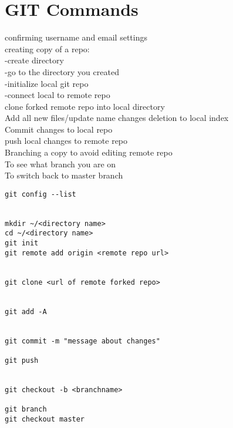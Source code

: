\documentclass[12pt,a4paper]{report}
\begin{document}
{\color{Magenta} \section{GIT Commands}}
\begin{tcolorbox}[colback=pageyl,colframe=pagebl,title= GIT Commands \hfill ,coltitle=Magenta,fonttitle=\bfseries,coltext=Black, width=0.9\paperwidth,boxrule=2mm]\colorbox{pageyl}{\noindent\begin{minipage}[t]{0.3\textwidth}\sffamily \color{ctnb}
\vspace{\baselineskip}
confirming username and email settings\\[\baselineskip]
creating copy of a repo: \\
-create directory \\
-go to the directory you created \\
-initialize local git repo\\
-connect local to remote repo\\[\baselineskip]
clone forked remote repo into local directory\\[\baselineskip]
Add all new files/update name changes deletion to local index\\[\baselineskip]
Commit changes to local repo\\[\baselineskip]
push local changes to remote repo\\[\baselineskip]
Branching a copy to avoid editing remote repo\\
To see what branch you are on\\
To switch back to master branch
\end{minipage}}\qquad\begin{minipage}[t]{0.664\textwidth}
{\begin{lstlisting}[frame=single,framerule=0pt, numbers=none, numbersep=10pt, aboveskip=20pt,belowskip=20pt]
git config --list


mkdir ~/<directory name>
cd ~/<directory name>
git init
git remote add origin <remote repo url>


git clone <url of remote forked repo>


git add -A


git commit -m "message about changes"

git push


git checkout -b <branchname>

git branch
git checkout master
\end{lstlisting}}\end{minipage}\end{tcolorbox}
\end{document}
